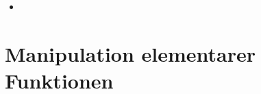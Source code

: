 \begin{itemize}
\begin{proof}
\begin{equation}
\begin{aligned}
				&\Leftrightarrow \left(x_1x_2 \dots x_{n-1}\right)^{\frac{1}{n}} * \left(x_1x_2 \dots x_{n-1}\right)^{\frac{1}{n^2-n}} \\
				&\Leftrightarrow \left(x_1x_2 \dots x_{n-1}\right)^{\frac{1}{n} + \frac{1}{n^2-n}}\\
				&\Leftrightarrow \left(x_1x_2 \dots x_{n-1}\right)^{\frac{1}{n-1}} \\
				&\Leftrightarrow \sqrt[n-1]{x_1x_2 \dots x_{n-1}} = x_{n-1}\\
				\end{aligned}
			\end{equation}
			Damit gilt:  $\sqrt[n]{x_1x_2 \dots x_{n-1}*\sqrt[n-1]{x_1x_2 \dots x_{n-1}}} = \sqrt[n-1]{x_1x_2 \dots x_{n-1}}$ \\
			x_n einsetzen in Ungleichung  \\
			
			\begin{equation}
				\begin{aligned}
					\frac{x_1+x_2+ \dots +x_{n-1}+\sqrt[n-1]{x_1x_2 \dots x_{n-1}}}{n} &\geq \sqrt[n]{x_1x_2 \dots x_{n-1}*\sqrt[n-1]{x_1x_2 \dots x_{n-1}}} \quad |erstzen durch Term (s.o.)\notag \\
					\frac{x_1+x_2+ \dots +x_{n-1}+\sqrt[n-1]{x_1x_2 \dots x_{n-1}}}{n} &\geq  \sqrt[n-1]{x_1x_2 \dots x_{n-1}} \\
					\Leftrightarrow x_1+x_2+ \dots + x_{n-1}+\sqrt[n-1]{x_1x_2 \dots x_{n-1}} &\geq n*\sqrt[n-1]{x_1x_2 \dots x_{n-1}}	\\				
				    \Leftrightarrow x_1+x_2+ \dots + x_{n-1} &\geq n*\sqrt[n-1]{x_1x_2 \dots x_{n-1}} - \sqrt[n-1]{x_1x_2 \dots x_{n-1}} \\
				    \Leftrightarrow x_1+x_2+ \dots + x_{n-1} &\geq  \left(n-1\right)*	\sqrt[n-1]{x_1x_2 \dots x_{n-1}} \\
				    \Leftrightarrow \frac{x_1+x_2+ \dots + x_{n-1}}{n-1} &\geq \sqrt[n-1]{x_1x_2 \dots x_{n-1}} \Leftrightarrow P(n-1)\\				
				\end{aligned}
			\end{equation}
		\end{proof}
	\item 
	
  \end{itemize}

\newpage

\section{Manipulation elementarer Funktionen}

